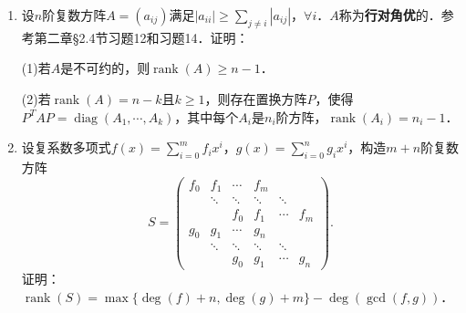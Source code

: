\documentclass[a4paper,fontset=windows]{ctexbook}
\theoremstyle{definition}
\DeclareMathOperator{\diag}{diag}
\DeclareMathOperator{\rank}{rank}
\renewcommand{\le}{\leqslant}
\renewcommand{\ge}{\geqslant}
\begin{document}
\begin{enumerate}
(3) $\rank(A\otimes B)=\rank(A)\rank(B)$

(4) $\rank\begin{pmatrix}A&B \\ B&A\end{pmatrix}=\rank(A+B)+\rank(A-B)$

(5) $\rank(AC-BD)\le\rank(A-B)+\rank(C-D)$，其中$A,B\in\mathbb{F}^{m\times n}$，$C,D\in\mathbb{F}^{n\times p}$．

(6) $-\dfrac{n}{2}\le\rank(AB)-\rank(BA)\le\dfrac{m}{2}$，其中$A\in\mathbb{F}^{m\times n}$，$B\in\mathbb{F}^{n\times m}$．

\item 设$n$阶复数方阵$A=(a_{ij})$满足$|a_{ii}|\ge\sum\limits_{j\ne i}|a_{ij}|$，$\forall i$．$A$称为{\bf 行对角优}的．参考第二章\S 2.4节习题12和习题14．证明：

(1)若$A$是不可约的，则$\rank(A)\ge n-1$．

(2)若$\rank(A)=n-k$且$k\ge 1$，则存在置换方阵$P$，使得$P^TAP=\diag(A_1,\cdots,A_k)$，其中每个$A_i$是$n_i$阶方阵，$\rank(A_i)=n_i-1$．

\item 设复系数多项式$f(x)=\sum\limits_{i=0}^mf_ix^i$，$g(x)=\sum\limits_{i=0}^ng_ix^i$，构造$m+n$阶复数方阵
$$S=\begin{pmatrix}f_0&f_1&\cdots&f_m&& \\ &\ddots&\ddots&\ddots&\ddots& \\ &&f_0&f_1&\cdots&f_m \\ g_0&g_1&\cdots&g_n&& \\ &\ddots&\ddots&\ddots&\ddots& \\ &&g_0&g_1&\cdots&g_n\end{pmatrix}.$$
证明：$\rank(S)=\max\{\deg(f)+n,\deg(g)+m\}-\deg(\gcd(f,g))$．


\end{enumerate}
\end{document}
